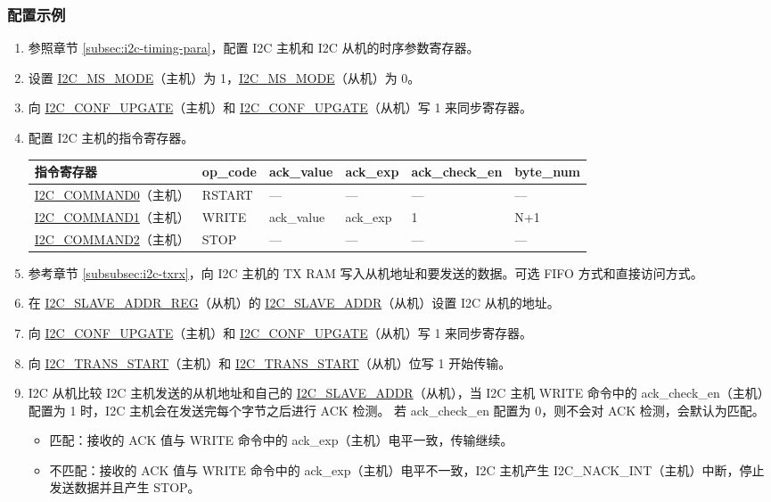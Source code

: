 \documentclass[main\_\_CN.tex]{subfiles}
\begin{document}
\subsubsection{配置示例}
\begin{enumerate}
\item 参照章节 \ref{subsec:i2c-timing-para}，配置 I2C 主机和 I2C 从机的时序参数寄存器。
\item 设置 \hyperref[fielddesc:I2CMSMODE]{I2C\_MS\_MODE}（主机）为 1，\hyperref[fielddesc:I2CMSMODE]{I2C\_MS\_MODE}（从机）为 0。
\item 向 \hyperref[fielddesc:I2CCONFUPGATE]{I2C\_CONF\_UPGATE}（主机）和 \hyperref[fielddesc:I2CCONFUPGATE]{I2C\_CONF\_UPGATE}（从机）写 1 来同步寄存器。
\clearpage
\item 配置 I2C 主机的指令寄存器。

\begin{longtable}{ | p{4cm} | p{2cm} | p{2cm} | p{2cm} |p{2cm} | p{2cm} |}
\hline\rowcolor{lightgray}
指令寄存器& op\_code & ack\_value&ack\_exp&ack\_check\_en&byte\_num  \\ \hline
\hyperref[fielddesc:I2CCOMMAND0]{I2C\_COMMAND0}（主机）& RSTART& ---&---&---&---  \\ \hline
\hyperref[fielddesc:I2CCOMMAND1]{I2C\_COMMAND1}（主机）& WRITE& ack\_value&ack\_exp&1&N+1  \\ \hline
\hyperref[fielddesc:I2CCOMMAND2]{I2C\_COMMAND2}（主机）& STOP& ---&---&---&---  \\ \hline
\end{longtable}

\item 参考章节 \ref{subsubsec:i2c-txrx}，向 I2C 主机的 TX RAM 写入从机地址和要发送的数据。可选 FIFO 方式和直接访问方式。
\item 在 \hyperref[regdesc:I2CSLAVEADDRREG]{I2C\_SLAVE\_ADDR\_REG}（从机）的 \hyperref[fielddesc:I2CSLAVEADDR]{I2C\_SLAVE\_ADDR}（从机）设置 I2C 从机的地址。
\item 向 \hyperref[fielddesc:I2CCONFUPGATE]{I2C\_CONF\_UPGATE}（主机）和 \hyperref[fielddesc:I2CCONFUPGATE]{I2C\_CONF\_UPGATE}（从机）写 1 来同步寄存器。
\item 向 \hyperref[fielddesc:I2CTRANSSTART]{I2C\_TRANS\_START}（主机）和 \hyperref[fielddesc:I2CTRANSSTART]{I2C\_TRANS\_START}（从机）位写 1 开始传输。
\item I2C 从机比较 I2C 主机发送的从机地址和自己的 \hyperref[fielddesc:I2CSLAVEADDR]{I2C\_SLAVE\_ADDR}（从机），当 I2C 主机 WRITE 命令中的 ack\_check\_en（主机）配置为 1 时，I2C 主机会在发送完每个字节之后进行 ACK 检测。 若 ack\_check\_en 配置为 0，则不会对 ACK 检测，会默认为匹配。
\begin{itemize}
\item 匹配：接收的 ACK 值与 WRITE 命令中的 ack\_exp（主机）电平一致，传输继续。
\item 不匹配：接收的 ACK 值与 WRITE 命令中的 ack\_exp（主机）电平不一致，I2C 主机产生 I2C\_NACK\_INT（主机）中断，停止发送数据并且产生 STOP。
\end{itemize}


\end{enumerate}
\end{document}
